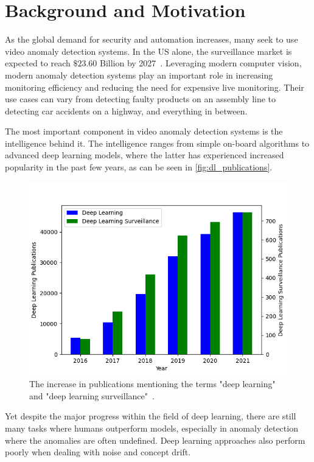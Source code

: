 \section{Background and Motivation}
As the global demand for security and automation increases, many seek to use video anomaly detection systems. In the US alone, the surveillance market is expected to reach $\$23.60$ Billion by 2027~\cite{us_video_stats}. Leveraging modern computer vision, modern anomaly detection systems play an important role in increasing monitoring efficiency and reducing the need for expensive live monitoring. Their use cases can vary from detecting faulty products on an assembly line to detecting car accidents on a highway, and everything in between.
\par
The most important component in video anomaly detection systems is the intelligence behind it. The intelligence ranges from simple on-board algorithms to advanced deep learning models, where the latter has experienced increased popularity in the past few years, as can be seen in \autoref{fig:dl_publications}.\par
\begin{figure}[htb]
    \centering
    \includegraphics[width=\linewidth]{resources/introduction/publications_graph}
    \caption[Publications Increase Comparison]{The increase in publications mentioning the terms "deep learning" and "deep learning surveillance"~\cite{deep_learning_surveillance_stats}.}
    \label{fig:dl_publications}
\end{figure}
Yet despite the major progress within the field of deep learning, there are still many tasks where humans outperform models, especially in anomaly detection where the anomalies are often undefined. Deep learning approaches also perform poorly when dealing with noise and concept drift.
